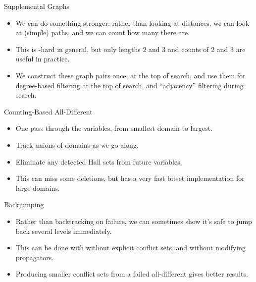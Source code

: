 \documentclass{beamer}
\begin{document}
\begin{frame}{Supplemental Graphs}
{
        \vspace{1em}
    }

     {
        \begin{itemize}
            \item We can do something stronger: rather than looking at distances, we can look at
                (simple) paths, and we can count how many there are.

            \item This is \NP-hard in general, but only lengths 2 and 3 and counts of 2 and 3 are
                useful in practice.

            \item We construct these graph pairs once, at the top of search, and use them for
                degree-based filtering at the top of search, and ``adjacency'' filtering during
                search.
        \end{itemize}
    }
\end{frame}

\begin{frame}{Counting-Based All-Different}
    \begin{itemize}
        \item One pass through the variables, from smallest domain to largest.

        \item Track unions of domains as we go along.

        \item Eliminate any detected Hall sets from future variables.

        \item This can miss some deletions, but has a very fast bitset implementation for large
            domains.
    \end{itemize}
\end{frame}

\begin{frame}{Backjumping}
    \begin{itemize}
        \item Rather than backtracking on failure, we can sometimes show it's safe to jump back
            several levels immediately.
        \item This can be done with without explicit conflict sets, and without modifying
            propagators.
        \item Producing smaller conflict sets from a failed all-different gives better results.
    \end{itemize}
\end{frame}
\end{document}
